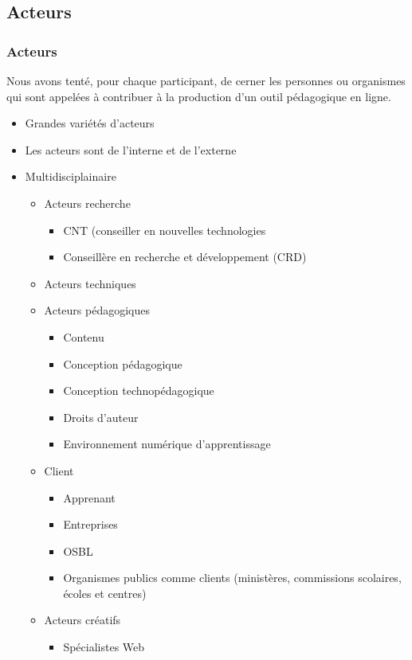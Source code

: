 		 \subsection{Acteurs} 
					\begin{frame}[allowframebreaks]
						\frametitle{Acteurs}
                        			Nous avons tenté, pour chaque participant, de cerner les personnes ou organismes qui sont appelées à contribuer à la production d’un outil pédagogique en ligne.
							\begin{itemize}
							\item Grandes variétés d'acteurs
							\item Les acteurs sont de l'interne et de l'externe
							\item Multidisciplainaire
								\begin{itemize}
								\item Acteurs recherche
									\begin{itemize}
									\item CNT (conseiller en nouvelles technologies
									\item Conseillère en recherche et développement (CRD)
									\end{itemize}
								\item Acteurs techniques													
								\item Acteurs pédagogiques
									\begin{itemize}
									\item Contenu
									\item Conception pédagogique
									\item Conception technopédagogique
									\item Droits d'auteur
									\item Environnement numérique d'apprentissage
									\end{itemize}
								\item Client
									\begin{itemize}
									\item Apprenant
									\item Entreprises
									\item OSBL
									\item Organismes publics comme clients (ministères, commissions scolaires, écoles et centres)
								\end{itemize}
								\item Acteurs créatifs
									\begin{itemize}
									\item Spécialistes Web

\end{itemize}
\end{itemize}
\end{itemize}
\end{frame}
